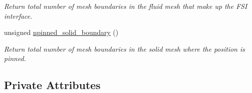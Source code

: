\begin{DoxyCompactItemize}
\begin{DoxyCompactList}\small\item\em Return total number of mesh boundaries in the fluid mesh that make up the F\+SI interface. \end{DoxyCompactList}\item 
unsigned \hyperlink{classUnstructuredFSIProblem_a221ed63d39e5377626e458b2c070541e}{npinned\+\_\+solid\+\_\+boundary} ()
\begin{DoxyCompactList}\small\item\em Return total number of mesh boundaries in the solid mesh where the position is pinned. \end{DoxyCompactList}\end{DoxyCompactItemize}
\subsection*{Private Attributes}
